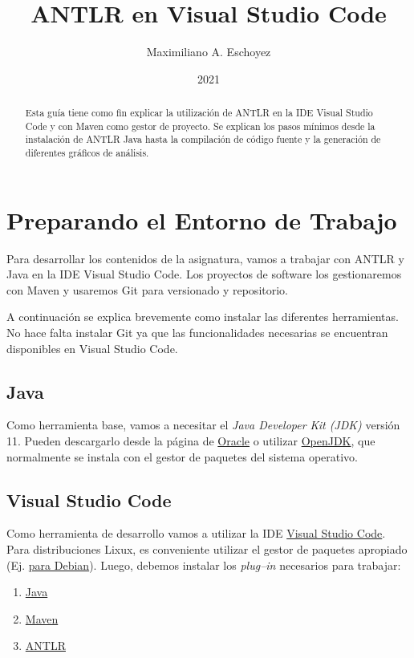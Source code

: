 \documentclass[a5paper,10pt]{article}
\author{Maximiliano A. Eschoyez}
\title{ANTLR en Visual Studio Code}
\date{2021}
\begin{document}
\maketitle


\begin{abstract}
	Esta guía tiene como fin explicar la utilización de ANTLR en la IDE Visual Studio Code y con Maven como gestor de proyecto.  Se explican los pasos mínimos desde la instalación de ANTLR Java hasta la compilación de código fuente y la generación de diferentes gráficos de análisis.
\end{abstract}

\section{Preparando el Entorno de Trabajo}
\label{intro}

Para desarrollar los contenidos de la asignatura, vamos a trabajar con ANTLR y Java en la IDE Visual Studio Code.  Los proyectos de software los gestionaremos con Maven y usaremos Git para versionado y repositorio.

A continuación se explica brevemente como instalar las diferentes herramientas.  No hace falta instalar Git ya que las funcionalidades necesarias se encuentran disponibles en Visual Studio Code.

\subsection{Java}
\label{Java}

Como herramienta base, vamos a necesitar el \emph{Java Developer Kit (JDK)} versión 11. Pueden descargarlo desde la página de \href{https://www.oracle.com/java/technologies/javase-downloads.html}{Oracle} o utilizar \href{https://openjdk.java.net/}{OpenJDK}, que normalmente se instala con el gestor de paquetes del sistema operativo.


\subsection{Visual Studio Code}
\label{vscode}

Como herramienta de desarrollo vamos a utilizar la IDE \href{https://code.visualstudio.com/}{Visual Studio Code}.  Para distribuciones Lixux, es conveniente utilizar el gestor de paquetes apropiado (Ej. \href{https://wiki.debian.org/VisualStudioCode}{para Debian}).  Luego, debemos instalar los \emph{plug--in} necesarios para trabajar:
\begin{enumerate}
	\item \hyperref[pluginJava]{Java}
	\item \hyperref[pluginMaven]{Maven}
	\item \hyperref[pluginANTLR]{ANTLR}
\end{enumerate}
\end{document}
